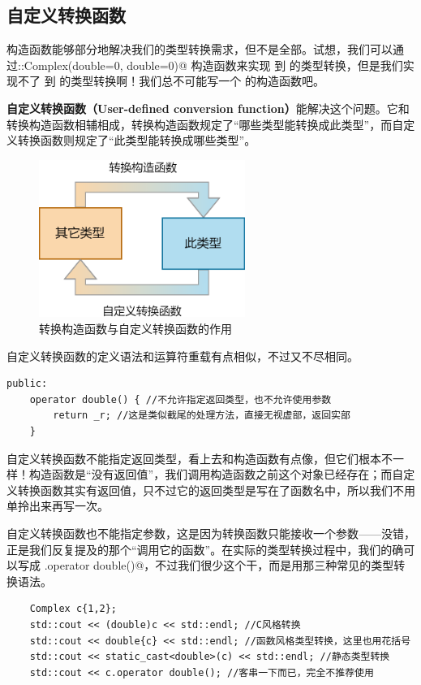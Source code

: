 \subsection*{自定义转换函数}
构造函数能够部分地解决我们的类型转换需求，但不是全部。试想，我们可以通过\newline\lstinline@Complex::Complex(double={0}, double={0})@ 构造函数来实现 \lstinline@double@ 到 \lstinline@Complex@ 的类型转换，但是我们实现不了 \lstinline@Complex@ 到 \lstinline@double@ 的类型转换啊！我们总不可能写一个 \lstinline@double@ 的构造函数吧。\par
\textbf{自定义转换函数（User-defined conversion function）}能解决这个问题。它和转换构造函数相辅相成，转换构造函数规定了``哪些类型能转换成此类型''，而自定义转换函数则规定了``此类型能转换成哪些类型''。
\begin{figure}[htbp]
    \centering
    \includegraphics[width=0.6\textwidth]{../images/generalized_parts/08_type_conversion_between_classes.drawio.png}
    \caption{转换构造函数与自定义转换函数的作用}
\end{figure}\pagebreak
自定义转换函数的定义语法和运算符重载有点相似，不过又不尽相同。
\begin{lstlisting}
public:
    operator double() { //不允许指定返回类型，也不允许使用参数
        return _r; //这是类似截尾的处理方法，直接无视虚部，返回实部
    }
\end{lstlisting}
自定义转换函数不能指定返回类型，看上去和构造函数有点像，但它们根本不一样！构造函数是``没有返回值''，我们调用构造函数之前这个对象已经存在；而自定义转换函数其实有返回值，只不过它的返回类型是写在了函数名中，所以我们不用单拎出来再写一次。\par
自定义转换函数也不能指定参数，这是因为转换函数只能接收一个参数——没错，正是我们反复提及的那个``调用它的函数''。在实际的类型转换过程中，我们的确可以写成 \lstinline@c.operator double()@，不过我们很少这个干，而是用那三种常见的类型转换语法。
\begin{lstlisting}
    Complex c{1,2};
    std::cout << (double)c << std::endl; //C风格转换
    std::cout << double{c} << std::endl; //函数风格类型转换，这里也用花括号
    std::cout << static_cast<double>(c) << std::endl; //静态类型转换
    std::cout << c.operator double(); //客串一下而已，完全不推荐使用
\end{lstlisting}\par
